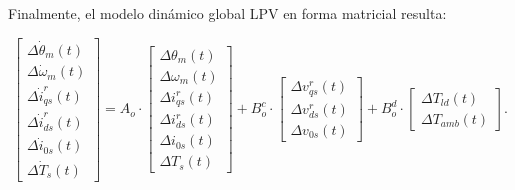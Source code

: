 \documentclass{article}
\begin{document}
Finalmente, el modelo dinámico global LPV en forma matricial resulta:

\begin{equation}
\begin{bmatrix}
\Delta \dot{\theta}_m(t) \\
\Delta \dot{\omega}_m(t) \\
\Delta \dot{i}_{qs}^r(t) \\
\Delta \dot{i}_{ds}^r(t) \\
\Delta \dot{i}_{0s}(t) \\
\Delta \dot{T}_s(t)
\end{bmatrix}
=
A_o \cdot
\begin{bmatrix}
\Delta \theta_m(t) \\
\Delta \omega_m(t) \\
\Delta i_{qs}^r(t) \\
\Delta i_{ds}^r(t) \\
\Delta i_{0s}(t) \\
\Delta T_s(t)
\end{bmatrix}
+
B_o^c \cdot
\begin{bmatrix}
\Delta v_{qs}^r(t) \\
\Delta v_{ds}^r(t) \\
\Delta v_{0s}(t)
\end{bmatrix}
+
B_o^d \cdot
\begin{bmatrix}
\Delta T_{ld}(t) \\
\Delta T_{amb}(t)
\end{bmatrix}.
\end{equation}
\end{document}
